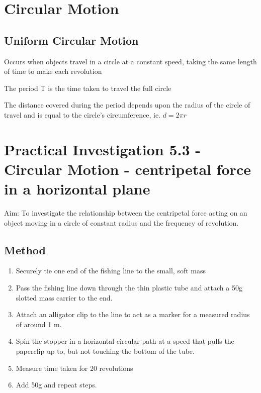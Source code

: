 \section{Circular Motion} \label{4/11/2024}
	\subsection{Uniform Circular Motion}
	Occurs when objects travel in a circle at a constant speed, taking the same length of time to make each revolution

	The period T is the time taken to travel the full circle

	The distance covered during the period depends upon the radius of the circle of travel and is equal to the circle's circumference, ie. $d=2\pi r$

\section{Practical Investigation 5.3 - Circular Motion - centripetal force in a horizontal plane}

	Aim: To investigate the relationship between the centripetal force acting on an object moving in a circle of constant radius and the frequency of revolution.

	\subsection{Method}
		\begin{enumerate}
			\item Securely tie one end of the fishing line to the small, soft mass
			\item Pass the fishing line down through the thin plastic tube and attach a 50g slotted mass carrier to the end.
			\item Attach an alligator clip to the line to act as a marker for a measured radius of around 1 m.
			\item Spin the stopper in a horizontal circular path at a speed that pulls the paperclip up to, but not touching the bottom of the tube.
			\item Measure time taken for 20 revolutions
			\item Add 50g and repeat steps.
		\end{enumerate}

